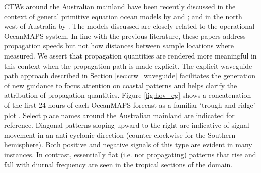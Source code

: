 CTWs around the Australian mainland have been recently discussed in the context of general primitive equation ocean models by \citet{Woodham:2013cl} and \citet{Liao:2018jd}; and in the north west of Australia by \citep{Maxime:2019jc}.  The models discussed are closely related to the operational OceanMAPS system. 
In line with the previous literature, these papers address propagation speeds but not how distances between sample locations where measured.
We assert that propagation quantities are rendered more meaningful in this context when the propagation path is made explicit.
The explicit waveguide path approach described in Section \ref{sec:ctw_waveguide} facilitates the generation of new guidance to focus attention on coastal patterns and helps clarify the attribution of propagation quantities.  
Figure \ref{fig:hov_eg} shows a concatenation of the first 24-hours of each OceanMAPS forecast as a familiar `trough-and-ridge' plot \citep{hovmoller:1949}.
Select place names around the Australian mainland are indicated for reference.
Diagonal patterns sloping upward to the right are indicative of signal movement in an anti-cyclonic direction (counter clockwise for the Southern hemisphere).  Both positive and negative signals of this type are evident in many instances.
In contrast, essentially flat (i.e. not propagating) patterns that rise and fall with diurnal frequency are seen in the tropical sections of the domain.   


